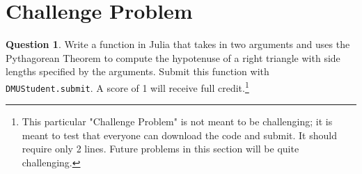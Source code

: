 \documentclass{article}
\theoremstyle{definition}
\newtheorem{question}[thm]{Question}
\begin{document}


\section{Challenge Problem}

\begin{question}
    Write a function in Julia that takes in two arguments and uses the Pythagorean Theorem to compute the hypotenuse of a right triangle with side lengths specified by the arguments. Submit this function with \texttt{DMUStudent.submit}. A score of 1 will receive full credit.\footnote{This particular "Challenge Problem" is not meant to be challenging; it is meant to test that everyone can download the code and submit. It should require only 2 lines. Future problems in this section will be quite challenging.}
\end{question}
\end{document}
